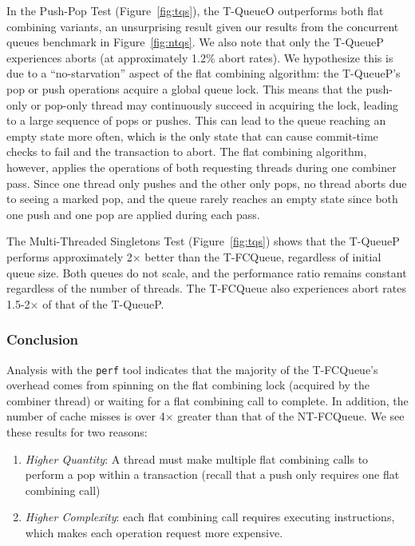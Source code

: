 In the Push-Pop Test (Figure~\ref{fig:tqs}), the T-QueueO outperforms both flat combining variants, an unsurprising result given our results from the concurrent queues benchmark in Figure~\ref{fig:ntqs}. We also note that only the T-QueueP experiences aborts (at approximately 1.2\% abort rates). We hypothesize this is due to a ``no-starvation'' aspect of the flat combining algorithm: the T-QueueP's pop or push operations acquire a global queue lock. This means that the push-only or pop-only thread may continuously succeed in acquiring the lock, leading to a large sequence of pops or pushes. This can lead to the queue reaching an empty state more often, which is the only state that can cause commit-time checks to fail and the transaction to abort. The flat combining algorithm, however, applies the operations of both requesting threads during one combiner pass. Since one thread only pushes and the other only pops, no thread aborts due to seeing a marked pop, and the queue rarely reaches an empty state since both one push and one pop are applied during each pass.

The Multi-Threaded Singletons Test (Figure~\ref{fig:tqs}) shows that the T-QueueP performs approximately 2$\times$ better than the T-FCQueue, regardless of initial queue size. Both queues do not scale, and the performance ratio remains constant regardless of the number of threads. The T-FCQueue also experiences abort rates 1.5-2$\times$ of that of the T-QueueP.

\vspace{12pt}
\noindent{}

\subsubsection{Conclusion}
Analysis with the \texttt{perf} tool indicates that the majority of the T-FCQueue's overhead comes from spinning on the flat combining lock (acquired by the combiner thread) or waiting for a flat combining call to complete. In addition, the number of cache misses is over 4$\times$ greater than that of the NT-FCQueue. We see these results for two reasons:
\begin{enumerate}
\item \emph{Higher Quantity}: A thread must make multiple flat combining calls to perform a pop within a transaction (recall that a push only requires one flat combining call) 
\item \emph{Higher Complexity}: each flat combining call requires executing instructions, which makes each operation request more expensive.
\end{enumerate}

